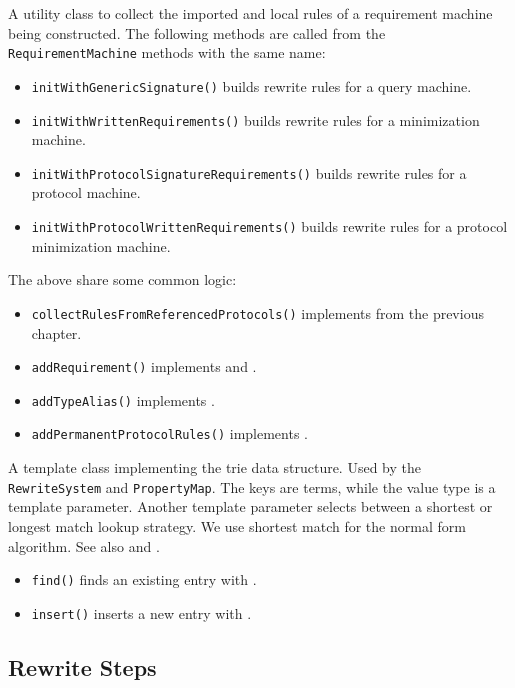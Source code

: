 \documentclass[../generics]{subfiles}
\begin{document}
A utility class to collect the imported and local rules of a requirement machine being constructed. The following methods are called from the \texttt{RequirementMachine} methods with the same name:
\begin{itemize}
\item \texttt{initWithGenericSignature()} builds rewrite rules for a query machine.
\item \texttt{initWithWrittenRequirements()} builds rewrite rules for a minimization machine.
\item \texttt{initWithProtocolSignatureRequirements()} builds rewrite rules for a protocol machine.
\item \texttt{initWithProtocolWrittenRequirements()} builds rewrite rules for a protocol minimization machine.
\end{itemize}
The above share some common logic:
\begin{itemize}
\item \texttt{collectRulesFromReferencedProtocols()} implements  from the previous chapter.
\item \texttt{addRequirement()} implements  and .
\item \texttt{addTypeAlias()} implements .
\item \texttt{addPermanentProtocolRules()} implements .
\end{itemize}

A template class implementing the trie data structure. Used by the \texttt{RewriteSystem} and \texttt{PropertyMap}. The keys are terms, while the value type is a template parameter. Another template parameter selects between a shortest or longest match lookup strategy. We use shortest match for the normal form algorithm. See also  and .
\begin{itemize}
\item \texttt{find()} finds an existing entry with .
\item \texttt{insert()} inserts a new entry with .
\end{itemize}

\subsection*{Rewrite Steps}
\end{document}

